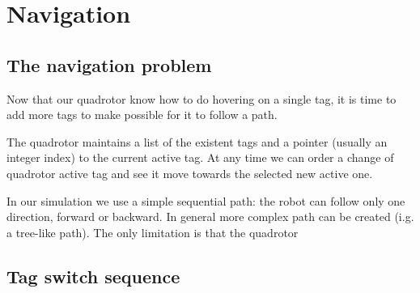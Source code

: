 \section{Navigation}

\subsection{The navigation problem}

Now that our quadrotor know how to do hovering on a single tag, it is time to
add more tags to make possible for it to follow a path.

The quadrotor maintains a list of the existent tags and a pointer (usually an
integer index) to the current active tag. At any time we can order a change of quadrotor active tag 
and see it move towards the selected new active one.

In our simulation we use a simple sequential path: the robot can follow only
one direction, forward or backward. In general more complex path can be created
(i.g. a tree-like path). The only limitation is that the quadrotor 

\subsection{Tag switch sequence}

